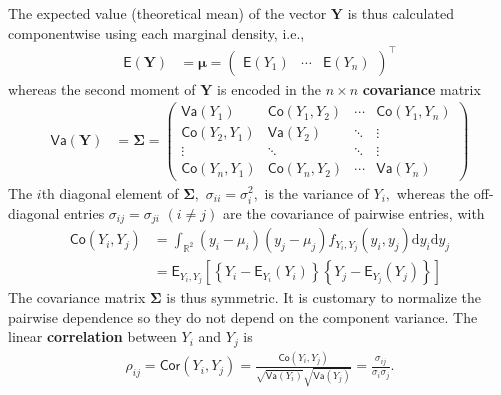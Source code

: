 \documentclass[
  11pt,
  letterpaper,
]{scrbook}
\theoremstyle{definition}
\theoremstyle{plain}
\theoremstyle{plain}
\theoremstyle{plain}
\theoremstyle{definition}
\theoremstyle{definition}
\theoremstyle{plain}
\theoremstyle{plain}
\theoremstyle{remark}
\begin{document}
The expected value (theoretical mean) of the vector \(\boldsymbol{Y}\)
is thus calculated componentwise using each marginal density, i.e.,
\begin{align*}
\mathsf{E}(\boldsymbol{Y}) &= \boldsymbol{\mu}=
\begin{pmatrix}
\mathsf{E}(Y_1) &
\cdots  &
\mathsf{E}(Y_n)
\end{pmatrix}^\top
\end{align*} whereas the second moment of \(\boldsymbol{Y}\) is encoded
in the \(n \times n\) \textbf{covariance} matrix \begin{align*}
\mathsf{Va}(\boldsymbol{Y}) &= \boldsymbol{\Sigma} = \begin{pmatrix} \mathsf{Va}(Y_1) & \mathsf{Co}(Y_1, Y_2)  & \cdots & \mathsf{Co}(Y_1, Y_n) \\
\mathsf{Co}(Y_2, Y_1) & \mathsf{Va}(Y_2) & \ddots & \vdots \\
\vdots & \ddots & \ddots & \vdots \\
\mathsf{Co}(Y_n, Y_1) & \mathsf{Co}(Y_n, Y_2) &\cdots & \mathsf{Va}(Y_n)
\end{pmatrix}
\end{align*} The \(i\)th diagonal element of \(\boldsymbol{\Sigma},\)
\(\sigma_{ii}=\sigma_i^2,\) is the variance of \(Y_i,\) whereas the
off-diagonal entries \(\sigma_{ij}=\sigma_{ji}\) \((i \neq j)\) are the
covariance of pairwise entries, with \begin{align*}
\mathsf{Co}(Y_i, Y_j) &= \int_{\mathbb{R}^2} (y_i-\mu_i)(y_j-\mu_j) f_{Y_i, Y_j}(y_i, y_j) \mathrm{d} y_i \mathrm{d} y_j \\
&= \mathsf{E}_{Y_i, Y_j}\left[\left\{Y_i-\mathsf{E}_{Y_i}(Y_i)\right\}\left\{Y_j-\mathsf{E}_{Y_j}(Y_j)\right\}\right]
\end{align*} The covariance matrix \(\boldsymbol{\Sigma}\) is thus
symmetric. It is customary to normalize the pairwise dependence so they
do not depend on the component variance. The linear \textbf{correlation}
between \(Y_i\) and \(Y_j\) is \begin{align*}
\rho_{ij}=\mathsf{Cor}(Y_i,Y_j)=\frac{\mathsf{Co}(Y_i, Y_j)}{\sqrt{\mathsf{Va}(Y_i)}\sqrt{\mathsf{Va}(Y_j)}}=\frac{\sigma_{ij}}{\sigma_i\sigma_j}.
\end{align*}
\end{document}
